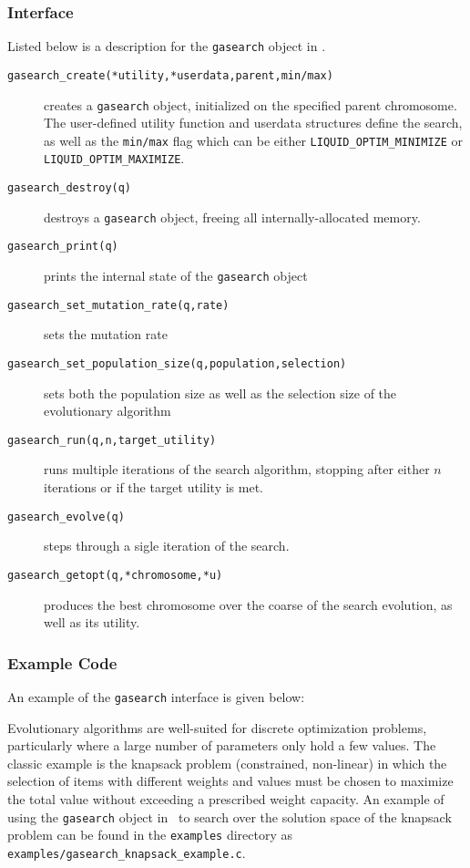 \subsubsection{Interface}
\label{module:optim:gasearch:interface}
%
Listed below is a description for the {\tt gasearch} object in
\liquid.
%
\begin{description}
\item[{\tt gasearch\_create(*utility,*userdata,parent,min/max)}]
    creates a {\tt gasearch} object, initialized on the specified
    parent chromosome.
    The user-defined utility function and userdata structures define the
    search, as well as the {\tt min/max} flag which can be either
    {\tt LIQUID\_OPTIM\_MINIMIZE} or
    {\tt LIQUID\_OPTIM\_MAXIMIZE}.
\item[{\tt gasearch\_destroy(q)}]
    destroys a {\tt gasearch} object, freeing all internally-allocated
    memory.
\item[{\tt gasearch\_print(q)}]
    prints the internal state of the {\tt gasearch} object
\item[{\tt gasearch\_set\_mutation\_rate(q,rate)}]
    sets the mutation rate
\item[{\tt gasearch\_set\_population\_size(q,population,selection)}]
    sets both the population size as well as the selection size of the
    evolutionary algorithm
\item[{\tt gasearch\_run(q,n,target\_utility)}]
    runs multiple iterations of the search algorithm,
    stopping after either $n$ iterations or if the target utility is
    met.
\item[{\tt gasearch\_evolve(q)}]
    steps through a sigle iteration of the search.
\item[{\tt gasearch\_getopt(q,*chromosome,*u)}]
    produces the best chromosome over the coarse of the search
    evolution, as well as its utility.
\end{description}
%

\subsubsection{Example Code}
\label{module:optim:gasearch:example}
An example of the {\tt gasearch} interface is given below:
%

%
Evolutionary algorithms are well-suited for discrete optimization
problems, particularly where a large number of parameters only hold a
few values.
The classic example is the knapsack problem (constrained, non-linear)
in which the selection of items with different weights and values must
be chosen to maximize the total value without exceeding a prescribed
weight capacity.
An example of using the {\tt gasearch} object in \liquid\ to search
over the solution space of the knapsack problem can be found in the
{\tt examples} directory as
{\tt examples/gasearch\_knapsack\_example.c}.

